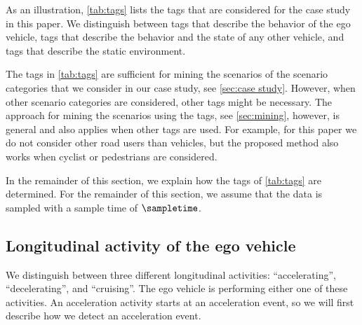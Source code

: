 \cstarta
As an illustration, \cref{tab:tags} lists the tags that are considered for the case study in this paper. 
We distinguish between tags that describe the behavior of the ego vehicle, tags that describe the behavior and the state of any other vehicle, and tags that describe the static environment. \cenda
\begin{remark}
	\cstarta The tags in \cref{tab:tags} are sufficient for mining the scenarios of the scenario categories that we consider in our case study, see \cref{sec:case study}. However, when other scenario categories are considered, other tags might be necessary. The approach for mining the scenarios using the tags, see \cref{sec:mining}, however, is general and also applies when other tags are used. \cenda 
	\cstartc For example, for this paper we do not consider other road users than vehicles, but the proposed method also works when cyclist or pedestrians are considered.\cendc
\end{remark}

In the remainder of this section, we explain how the tags of \cref{tab:tags} are determined. 
For the remainder of this section, we assume that the data is sampled with a sample time of $\sampletime$.



\subsection{Longitudinal activity of the ego vehicle}
\label{sec:longitudinal ego}

We distinguish between three different longitudinal activities: ``accelerating'', ``decelerating'', and ``cruising''. 
The ego vehicle is performing either one of these activities. 
\cstartc An acceleration activity starts at an acceleration event, so we will first describe how we detect an acceleration event.
\cendc

